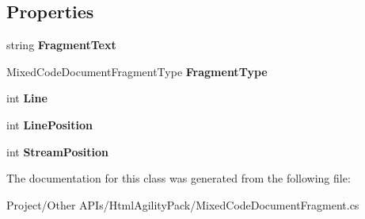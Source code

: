 \subsection*{Properties}
\begin{DoxyCompactItemize}
\item 
\mbox{\label{class_html_agility_pack_1_1_mixed_code_document_fragment_abb1dde76ebbf9684fc4a697569dda780}} 
string {\bfseries Fragment\+Text}
\item 
\mbox{\label{class_html_agility_pack_1_1_mixed_code_document_fragment_ad49ecf809c4235bb36122ce051c65a7d}} 
Mixed\+Code\+Document\+Fragment\+Type {\bfseries Fragment\+Type}
\item 
\mbox{\label{class_html_agility_pack_1_1_mixed_code_document_fragment_acd6a8961b9a933a88df6d13bc7458bd5}} 
int {\bfseries Line}
\item 
\mbox{\label{class_html_agility_pack_1_1_mixed_code_document_fragment_ae336da0418a68798c5f945b2f1c2647c}} 
int {\bfseries Line\+Position}
\item 
\mbox{\label{class_html_agility_pack_1_1_mixed_code_document_fragment_ac00144fc95bf81a1673358ebfdf1d757}} 
int {\bfseries Stream\+Position}
\end{DoxyCompactItemize}


The documentation for this class was generated from the following file\+:\begin{DoxyCompactItemize}
\item 
Project/\+Other A\+P\+Is/\+Html\+Agility\+Pack/Mixed\+Code\+Document\+Fragment.\+cs\end{DoxyCompactItemize}
